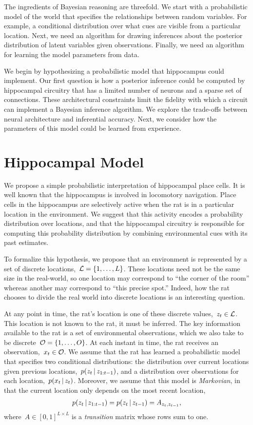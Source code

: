 The ingredients of Bayesian reasoning are threefold. We start with a 
probabilistic model of the world that specifies the relationships between
random variables. For example, a conditional distribution over what cues 
are visible from a particular location. Next, we need an algorithm for 
drawing inferences about the posterior distribution of latent variables 
given observations. Finally, we need an algorithm for learning the 
model parameters from data. 

We begin by hypothesizing a probabilistic model that hippocampus could implement.
Our first question is how a posterior inference could be computed by hippocampal 
circuitry that has a limited number of neurons and a sparse set of connections.
These architectural constraints limit the fidelity with which a circuit can 
implement a Bayesian inference algorithm. We explore the trade-offs between 
neural architecture and inferential accuracy. Next, we consider how the 
parameters of this model could be learned from experience.

\section{Hippocampal Model}
We propose a simple probabilistic interpretation of hippocampal place cells.
It is well known that the hippocampus is involved in locomotory navigation.
Place cells in the hippocampus are selectively active when the rat is 
in a particular location in the environment. We suggest that this activity 
encodes a probability distribution over locations, and that the hippocampal 
circuitry is responsible for computing this probability distribution by 
combining environmental cues with its past estimates. 

To formalize this hypothesis, we propose that an environment is represented 
by a set of discrete locations,~${\mathcal{L} = \{1, \ldots, L\}}$. These locations 
need not be the same size in the real-world, so one location may correspond to
``the corner of the room'' whereas another may correspond to ``this precise 
spot.'' Indeed, how the rat chooses to divide the real world into discrete 
locations is an interesting question.

At any point in time, 
the rat's location is one of these discrete values,~${z_t \in \mathcal{L}}$. 
This location is not known to the rat, it must be inferred. 
The key information available to the rat is a set of environmental observations,
which we also take to be discrete~${\mathcal{O} = \{1, \ldots, O\}}$. At 
each instant in time, the rat receives an observation,~${x_t \in \mathcal{O}}$. 
We assume that the rat has learned a probabilistic model that specifies 
two conditional distributions: the distribution over current locations given 
previous locations,~${p(z_{t} \,|\, z_{1:t-1})}$, and a distribution over observations 
for each location,~${p(x_t \,|\, z_{t})}$. Moreover, we assume that this 
model is \emph{Markovian}, in that the current location only depends 
on the most recent location,
\begin{align}
p(z_t \,|\, z_{1:t-1}) = p(z_t \,|\, z_{t-1}) = A_{z_t, z_{t-1}},
\end{align}
where~$A \in [0,1]^{L \times L}$ is a \emph{transition} matrix whose rows sum to one.



